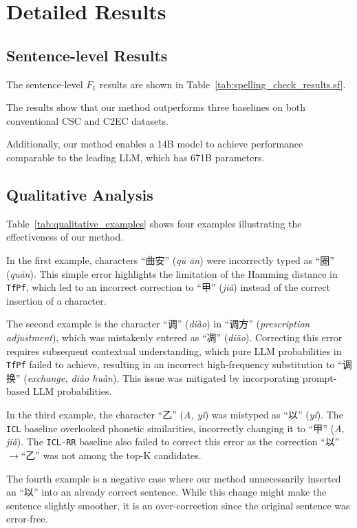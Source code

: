 \section{Detailed Results}
\label{sec:detailed_results}
\subsection{Sentence-level Results}
\label{subsec:sentence_level_results}

The sentence-level $F_1$ results are shown in Table~\ref{tab:spelling_check_results.sf}.

The results show that our method outperforms three baselines on both conventional CSC and C2EC datasets.

Additionally, our method enables a 14B model to achieve performance comparable to the leading LLM, which has 671B parameters.

\subsection{Qualitative Analysis}
\label{subsec:qualitative_analysis}

Table~\ref{tab:qualitative_examples} shows four examples illustrating the effectiveness of our method.

In the first example, characters ``曲安'' (\textit{qū ān}) were incorrectly typed as ``圈'' (\textit{quān}).
This simple error highlights the limitation of the Hamming distance in \texttt{TfPf}, which led to an incorrect correction to ``甲'' (\textit{jiǎ}) instead of the correct insertion of a character.

The second example is the character ``调'' (\textit{diào}) in ``调方'' (\textit{prescription adjustment}), which was mistakenly entered as ``凋'' (\textit{diāo}).
Correcting this error requires subsequent contextual understanding, which pure LLM probabilities in \texttt{TfPf} failed to achieve, resulting in an incorrect high-frequency substitution to ``调换'' (\textit{exchange, diào huàn}).
This issue was mitigated by incorporating prompt-based LLM probabilities.

In the third example, the character ``乙'' (\textit{A, yǐ}) was mistyped as ``以'' (\textit{yǐ}).
The \texttt{ICL} baseline overlooked phonetic similarities, incorrectly changing it to ``甲'' (\textit{A, jiǎ}).
The \texttt{ICL-RR} baseline also failed to correct this error as the correction ``以''$\rightarrow$``乙'' was not among the top-K candidates.

The fourth example is a negative case where our method unnecessarily inserted an ``以'' into an already correct sentence.
While this change might make the sentence slightly smoother, it is an over-correction since the original sentence was error-free.


